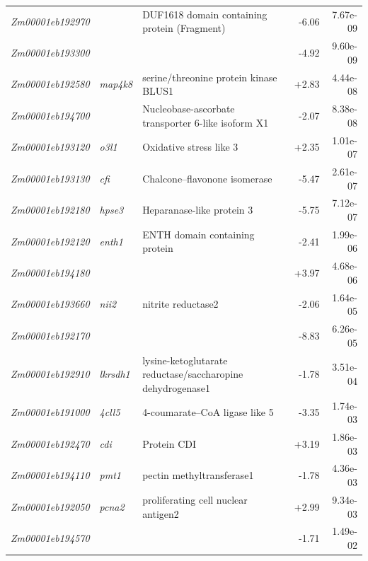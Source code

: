 \documentclass[9pt,twocolumn,twoside]{rilabRxiv}
\begin{document}
\begin{table}[!ht]
{\begin{tabular}{lllrr}
  \textit{Zm00001eb192970} &  & DUF1618 domain containing protein (Fragment) & -6.06 & 7.67e-09 \\
  \textit{Zm00001eb193300} &  &  & -4.92 & 9.60e-09 \\
  \textit{Zm00001eb192580} & \textit{map4k8} & serine/threonine protein kinase BLUS1 & +2.83 & 4.44e-08 \\
  \textit{Zm00001eb194700} &  & Nucleobase-ascorbate transporter 6-like isoform X1 & -2.07 & 8.38e-08 \\
  \textit{Zm00001eb193120} & \textit{o3l1} & Oxidative stress like 3 & +2.35 & 1.01e-07 \\
  \textit{Zm00001eb193130} & \textit{cfi} & Chalcone--flavonone isomerase & -5.47 & 2.61e-07 \\
  \textit{Zm00001eb192180} & \textit{hpse3} & Heparanase-like protein 3 & -5.75 & 7.12e-07 \\
  \textit{Zm00001eb192120} & \textit{enth1} & ENTH domain containing protein & -2.41 & 1.99e-06 \\
  \textit{Zm00001eb194180} &  &  & +3.97 & 4.68e-06 \\
  \textit{Zm00001eb193660} & \textit{nii2} & nitrite reductase2 & -2.06 & 1.64e-05 \\
  \textit{Zm00001eb192170} &  &  & -8.83 & 6.26e-05 \\
  \textit{Zm00001eb192910} & \textit{lkrsdh1} & lysine-ketoglutarate reductase/saccharopine dehydrogenase1 & -1.78 & 3.51e-04 \\
  \textit{Zm00001eb191000} & \textit{4cll5} & 4-coumarate--CoA ligase like 5 & -3.35 & 1.74e-03 \\
  \textit{Zm00001eb192470} & \textit{cdi} & Protein CDI & +3.19 & 1.86e-03 \\
  \textit{Zm00001eb194110} & \textit{pmt1} & pectin methyltransferase1 & -1.78 & 4.36e-03 \\
  \textit{Zm00001eb192050} & \textit{pcna2} & proliferating cell nuclear antigen2 & +2.99 & 9.34e-03 \\
  \textit{Zm00001eb194570} &  &  & -1.71 & 1.49e-02 \\
\bottomrule
\end{tabular}}
\end{table}

\clearpage
\end{document}
